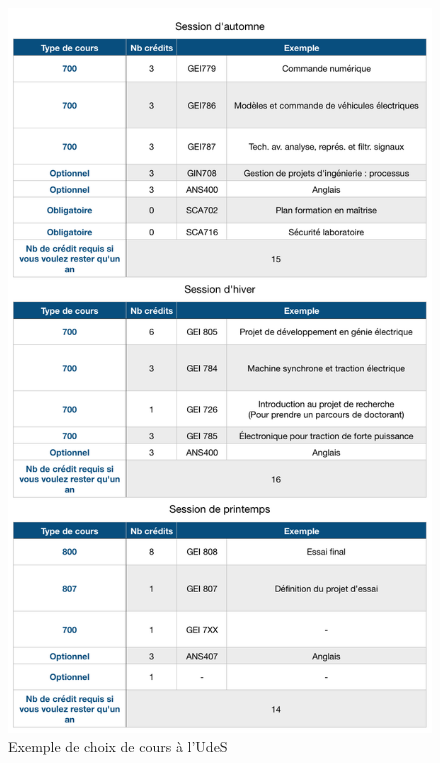\begin{figure}[h!]
\centering
\includegraphics[width = 130mm]{figures/Exemple_Sess}
\caption{Exemple de choix de cours à l'UdeS}
\end{figure}
\clearpage


